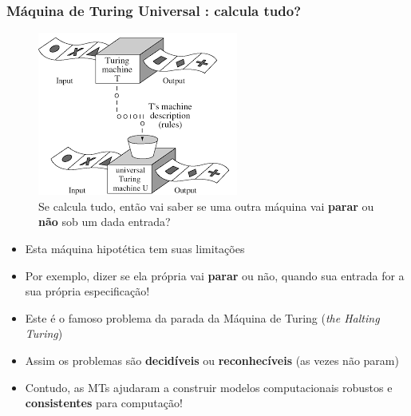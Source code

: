 \documentclass[10pt]{beamer}
\begin{document}
\begin{frame}[fragile]

\frametitle{ Máquina de Turing Universal : calcula tudo?}

\begin{minipage}[t]{0.475\linewidth}
 \begin{figure}[!ht]
	\centering
	\includegraphics[height =.6\textheight,width=.7\textwidth]
	{figuras/ex_calc_TM.png}
	\caption{Se calcula tudo, então vai saber se uma outra máquina vai {\bf parar} ou \textbf{não}  sob um dada entrada?}
\end{figure}
\end{minipage}
\begin{minipage}[t]{0.475\linewidth}
\begin{itemize}
\item Esta máquina hipotética tem suas limitações
\item Por exemplo, dizer se ela  própria vai {\bf parar} ou não, quando sua
entrada for a sua própria especificação!
\item Este é o famoso problema da parada da Máquina de Turing ({\em the Halting Turing})
\item Assim os problemas são {\bf decidíveis} ou {\bf reconhecíveis} (as vezes não param)
\item Contudo, as MTs ajudaram a construir modelos  computacionais robustos e 
{\bf consistentes} para computação!      
\end{itemize}

\end{minipage}


\end{frame}
\end{document}
